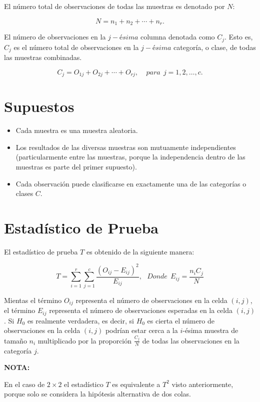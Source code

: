 \documentclass[
  a4paper,
  oneside,
  openany]{book}
\begin{document}
El número total de observaciones de todas las muestras es denotado por \(N\):

\[N=n_{1}+n_{2}+\cdots+n_{r}.\]

El número de observaciones en la \(j-ésima\) columna denotada como \(C_{j}\). Esto es, \(C_{j}\) es el número total de observaciones en la \(j-ésima\) categoría, o clase, de todas las muestras combinadas.

\[C_{j}=O_{1j}+O_{2j}+\cdots+O_{rj}, \ \ \ \ \ para\ \ j= 1,2,\ldots,c. \]

\hypertarget{supuestos-11}{%
\section{Supuestos}\label{supuestos-11}}

\begin{itemize}
\item
  Cada muestra es una muestra aleatoria.
\item
  Los resultados de las diversas muestras son mutuamente independientes (particularmente entre las muestras, porque la independencia dentro de las muestras es parte del primer supuesto).
\item
  Cada observación puede clasificarse en exactamente una de las categorías o clases \(C\).
\end{itemize}

\hypertarget{estaduxedstico-de-prueba-11}{%
\section{Estadístico de Prueba}\label{estaduxedstico-de-prueba-11}}

El estadístico de prueba \(T\) es obtenido de la siguiente manera:

\[T=\sum_{i=1}^{r}\sum_{j=1}^{c}\frac{(O_{ij}-E_{ij})^2}{E_{ij}}, \ \ \ Donde\ \ E_{ij}=\frac{n_{i}C_{j}}{N}\]

Mientas el término \(O_{ij}\) representa el número de observaciones en la celda \((i,j)\), el término \(E_{ij}\) representa el número de observaciones esperadas en la celda \((i,j)\). Si \(H_0\) es realmente verdadera, es decir, si \(H_0\) es cierta el número de observaciones en la celda \((i,j)\) podrían estar cerca a la \(i\)-ésima muestra de tamaño \(n_{i}\) multiplicado por la proporción \(\frac{C_{j}}{N}\) de todas las observaciones en la categoría \(j\).

\textbf{NOTA:}

En el caso de \(2 \times 2\) el estadístico \(T\) es equivalente a \(T^2\) visto anteriormente, porque solo se considera la hipótesis alternativa de dos colas.
\end{document}
